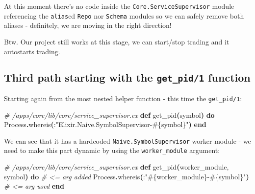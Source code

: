 \documentclass[
  oneside]{book}
\newenvironment{Shaded}{\begin{snugshade}}{\end{snugshade}}
\newcommand{\CommentTok}[1]{\textcolor[rgb]{0.56,0.35,0.01}{\textit{#1}}}
\newcommand{\ConstantTok}[1]{\textcolor[rgb]{0.56,0.35,0.01}{#1}}
\newcommand{\FunctionTok}[1]{\textcolor[rgb]{0.13,0.29,0.53}{\textbf{#1}}}
\newcommand{\KeywordTok}[1]{\textcolor[rgb]{0.13,0.29,0.53}{\textbf{#1}}}
\newcommand{\NormalTok}[1]{#1}
\newcommand{\OperatorTok}[1]{\textcolor[rgb]{0.81,0.36,0.00}{\textbf{#1}}}
\newcommand{\OtherTok}[1]{\textcolor[rgb]{0.56,0.35,0.01}{#1}}
\newcommand{\StringTok}[1]{\textcolor[rgb]{0.31,0.60,0.02}{#1}}
\begin{document}
At this moment there's no code inside the \texttt{Core.ServiceSupervisor} module referencing the \texttt{alias}ed \texttt{Repo} nor \texttt{Schema} modules so we can safely remove both aliases - definitely, we are moving in the right direction!

Btw. Our project still works at this stage, we can start/stop trading and it autostarts trading.

\subsection{\texorpdfstring{Third path starting with the \texttt{get\_pid/1} function}{Third path starting with the get\_pid/1 function}}\label{third-path-starting-with-the-get_pid1-function}

Starting again from the most nested helper function - this time the \texttt{get\_pid/1}:

\begin{Shaded}
\begin{Highlighting}[]
  \CommentTok{\# /apps/core/lib/core/service\_supervisor.ex}
  \KeywordTok{def}\NormalTok{ get\_pid}\FunctionTok{(}\NormalTok{symbol}\FunctionTok{)} \KeywordTok{do}
    \ConstantTok{Process}\OperatorTok{.}\NormalTok{whereis}\FunctionTok{(}\NormalTok{:}\StringTok{"Elixir.Naive.SymbolSupervisor{-}}\OtherTok{\#\{}\NormalTok{symbol}\OtherTok{\}}\StringTok{"}\FunctionTok{)}
  \KeywordTok{end}  
\end{Highlighting}
\end{Shaded}

We can see that it has a hardcoded \texttt{Naive.SymbolSupervisor} worker module - we need to make this part dynamic by using the \texttt{worker\_module} argument:

\begin{Shaded}
\begin{Highlighting}[]
  \CommentTok{\# /apps/core/lib/core/service\_supervisor.ex}
  \KeywordTok{def}\NormalTok{ get\_pid}\FunctionTok{(}\NormalTok{worker\_module, symbol}\FunctionTok{)} \KeywordTok{do}  \CommentTok{\# \textless{}= arg added}
    \ConstantTok{Process}\OperatorTok{.}\NormalTok{whereis}\FunctionTok{(}\NormalTok{:}\StringTok{"}\OtherTok{\#\{}\NormalTok{worker\_module}\OtherTok{\}}\StringTok{{-}}\OtherTok{\#\{}\NormalTok{symbol}\OtherTok{\}}\StringTok{"}\FunctionTok{)} \CommentTok{\# \textless{}= arg used}
  \KeywordTok{end}
\end{Highlighting}
\end{Shaded}
\end{document}
